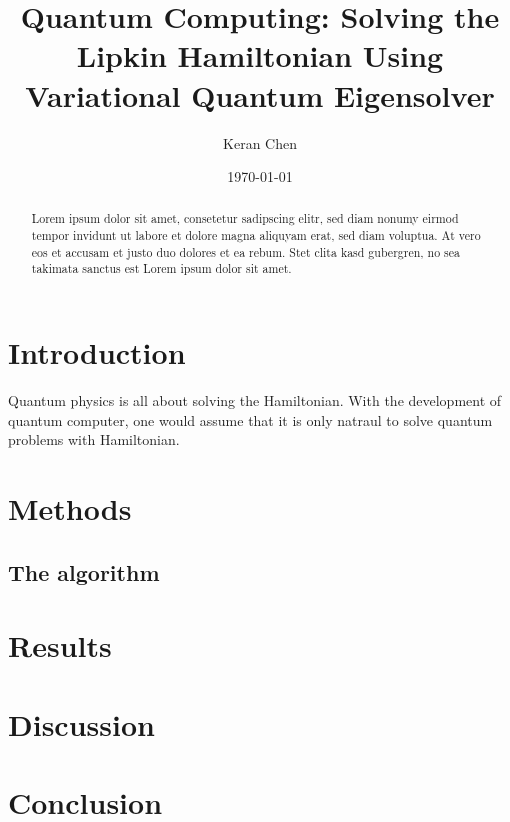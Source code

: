 \documentclass[english,notitlepage,reprint,nofootinbib]{revtex4-1}
\begin{document}
\title{Quantum Computing: Solving the Lipkin Hamiltonian Using Variational Quantum Eigensolver}
\author{Keran Chen} %
\date{\today}                             %
\noaffiliation                            %

\begin{abstract}
    
Lorem ipsum dolor sit amet, consetetur sadipscing elitr, sed diam nonumy eirmod tempor invidunt ut labore et dolore magna aliquyam erat, sed diam voluptua. At vero eos et accusam et justo duo dolores et ea rebum. Stet clita kasd gubergren, no sea takimata sanctus est Lorem ipsum dolor sit amet.

\end{abstract}
\maketitle


\section{Introduction}\label{sec:intro}
Quantum physics is all about solving the Hamiltonian. With the development of quantum computer, one would assume that it is only natraul to solve quantum problems with Hamiltonian.


%

\section{Methods}\label{sec:methods}
%

\subsection*{The algorithm}\label{sec:algo}
%

\section{Results}\label{sec:results}
%
\section{Discussion}\label{sec:discussion}
%

\section{Conclusion}\label{sec:conclusion}

\onecolumngrid

%

\end{document}
